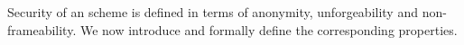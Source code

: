 Security of an \UAS scheme is defined in terms of anonymity, unforgeability and
non-frameability. We now introduce and formally define the corresponding
properties.





